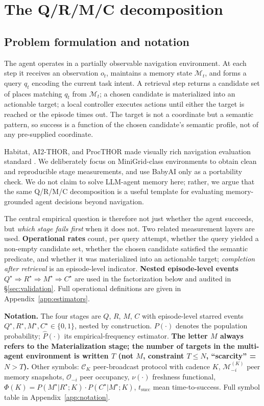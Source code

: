 \documentclass{article}
\begin{document}
\section{The Q/R/M/C decomposition}
\label{sec:framework}

\subsection{Problem formulation and notation}
\label{sec:notation}

The agent operates in a partially observable navigation environment.
At each step it receives an observation $o_t$, maintains a memory
state $\mathcal{M}_t$, and forms a query $q_t$ encoding the current
task intent. A retrieval step returns a candidate set of places
matching $q_t$ from $\mathcal{M}_t$; a chosen candidate is
materialized into an actionable target; a local controller executes
actions until either the target is reached or the episode times out.
The target is not a coordinate but a semantic pattern, so success is a
function of the chosen candidate's semantic profile, not of any
pre-supplied coordinate.

Habitat, AI2-THOR, and ProcTHOR made visually rich navigation
evaluation standard
\citep{savva2019habitat,kolve2017ai2thor,deitke2022procthor}. We
deliberately focus on MiniGrid-class environments to obtain clean and
reproducible stage measurements, and use BabyAI only as a portability
check. We do not claim to solve LLM-agent memory here; rather, we
argue that the same Q/R/M/C decomposition is a useful template for
evaluating memory-grounded agent decisions beyond navigation.

The central empirical question is therefore not just whether the agent
succeeds, but \emph{which stage fails first} when it does not. Two
related measurement layers are used. \textbf{Operational rates} count,
per query attempt, whether the query yielded a non-empty candidate
set, whether the chosen candidate satisfied the semantic predicate,
and whether it was materialized into an actionable target;
\emph{completion after retrieval} is an episode-level indicator.
\textbf{Nested episode-level events}
$Q^\star \Rightarrow R^\star \Rightarrow M^\star \Rightarrow C^\star$
are used in the factorization below and audited in
\S\ref{sec:validation}. Full operational definitions are given in
Appendix~\ref{app:estimators}.

\textbf{Notation.} The four stages are $Q$, $R$, $M$, $C$ with episode-level starred events $Q^\star,R^\star,M^\star,C^\star\!\in\!\{0,1\}$, nested by construction. $P(\cdot)$ denotes the population probability; $\hat{P}(\cdot)$ its empirical-frequency estimator. \textbf{The letter $M$ always refers to the Materialization stage; the number of targets in the multi-agent environment is written $T$ (not $M$, constraint $T{\le}N$, ``scarcity'' = $N{>}T$).} Other symbols: $\mathcal{C}_K$ peer-broadcast protocol with cadence $K$, $\mathcal{M}_{-i}^{(K)}$ peer memory snapshots, $\mathcal{O}_{-i}$ peer occupancy, $\nu(\cdot)$ freshness functional, $\Phi(K){=}P(M^\star|R^\star;K)\!\cdot\!P(C^\star|M^\star;K)$, $t_{\mathrm{succ}}$ mean time-to-success. Full symbol table in Appendix~\ref{app:notation}.
\end{document}
